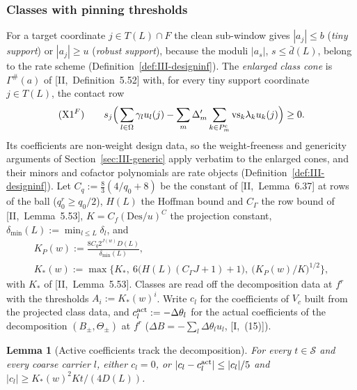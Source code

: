\documentclass[10pt]{amsart}
\newtheorem{lemma}[theorem]{Lemma}
\theoremstyle{definition}
\theoremstyle{remark}
\begin{document}
\subsubsection*{Classes with pinning thresholds}
For a target coordinate $j\in T(L)\cap F$ the clean sub-window gives
$|a_j|\le b$ (\emph{tiny support}) or $|a_j|\ge u$ (\emph{robust support}),
because the moduli $|a_s|$, $s\le\bar d(L)$, belong to the rate scheme
(Definition~\ref{def:III-designinf}).  The \emph{enlarged class cone} is
$\Gamma^\#(a)$ of [II,~Definition~5.52] with, for every tiny support
coordinate $j\in T(L)$, the contact row
\[
 \text{(X1$^F$)}\qquad s_j\Big(\sum_{l\in\Omega}\gamma_lu_l(j)-\sum_m\Delta'_m
 \sum_{k\in P^{\rm c}_m}\mathrm{vs}_k\lambda_ku_k(j)\Big)\ge0 .
\]
Its coefficients are non-weight design data, so the weight-freeness and
genericity arguments of Section~\ref{sec:III-generic} apply verbatim to the
enlarged cones, and their minors and cofactor polynomials are rate objects
(Definition~\ref{def:III-designinf}).  Let $C_q:=\frac83(4/q_0+8)$ be the
constant of [II,~Lemma~6.37] at rows of the ball ($q^r_0\ge q_0/2$), $H(L)$ the
Hoffman bound and $C_\Gamma$ the row bound of [II,~Lemma~5.53],
$K=C_f(\mathrm{Des}/u)^C$ the projection constant, $\delta_{\min}(L):=
\min_{l\le L}\delta_l$, and
\begin{gather*}
 K_P(w):=\frac{8C_q2^{J(w)}D(L)}{\delta_{\min}(L)},\\
 K_*(w):=\max\Big\{K_*,\ 6\big(H(L)(C_\Gamma J+1)+1\big),\ \big(K_P(w)/K
 \big)^{1/2}\Big\},
\end{gather*}
with $K_*$ of [II,~Lemma~5.53].  Classes are read off the decomposition data
at $f^r$ with the thresholds $A_i:=K_*(w)^i$.  Write $c_l$ for the
coefficients of $V_c$ built from the projected class data, and
$c^{\rm act}_l:=-\Delta\theta_l$ for the actual coefficients of the
decomposition $(B_\pm,\Theta_\pm)$ at $f^r$ ($\Delta B=-\sum_l\Delta\theta_lu_l$,
[I,~(15)]).

\begin{lemma}[Active coefficients track the decomposition]\label{lem:III-track}
For every $t\in\mathcal S$ and every coarse carrier $l$, either $c_l=0$, or
$|c_l-c^{\rm act}_l|\le|c_l|/5$ and $|c_l|\ge K_*(w)^2Kt/(4D(L))$.
\end{lemma}
\end{document}
